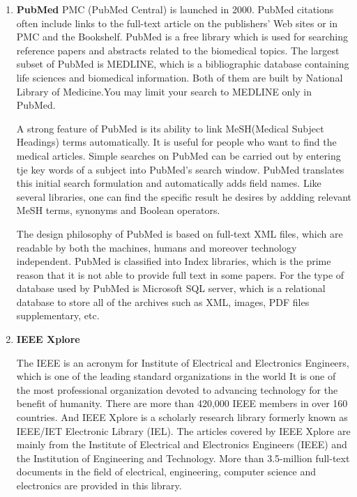 \begin{enumerate}
	
	\item\textbf{PubMed}
	\setlength{\parindent}{1em}
	 PMC (PubMed Central) is launched in 2000.
	 PubMed citations often include links to the full-text article on the publishers' Web sites or in PMC and the Bookshelf.
	 PubMed is a free library which is used for searching reference papers and abstracts related to the biomedical topics.
	 The largest subset of PubMed is MEDLINE, which is a bibliographic database containing life sciences and biomedical information.
	 Both of them are built by National Library of Medicine.You may limit your search to MEDLINE only in PubMed.
	 
	 A strong feature of PubMed is its ability to link MeSH(Medical Subject Headings) terms automatically. 
	 It is useful for people who want to find the medical articles. 
     Simple searches on PubMed can be carried out by entering tje key words of a subject into PubMed's search window.
     PubMed translates this initial search formulation and automatically adds field names.
	 Like several libraries, one can find the specific result he desires by addding relevant MeSH terms, synonyms and Boolean operators.
	 
	 The design philosophy of PubMed is based on full-text XML files, which are readable by both the machines, humans and moreover technology independent.
	 PubMed is classified into Index libraries, which is the prime reason that it is not able to provide full text in some papers.
	 For the type of database used by PubMed is Microsoft SQL server, which is a relational database to store all of 
	 the archives such as XML, images, PDF files supplementary, etc. 	 
	  
		
	\item\textbf{IEEE Xplore}
	\setlength{\parindent}{1em}
	
	The IEEE is an acronym for Institute of Electrical and Electronics Engineers, which is one of the leading standard organizations in the world 
	It is one of the most professional organization devoted to advancing technology for the benefit of humanity.
	There are more than 420,000 IEEE members in over 160 countries.
	And IEEE Xplore is a scholarly research library formerly known as IEEE/IET Electronic Library (IEL).
	The articles covered by IEEE Xplore are mainly from the Institute of Electrical and Electronics Engineers (IEEE) and the Institution of Engineering and Technology.
	More than 3.5-million full-text documents in the field of electrical, engineering, computer science and electronics are provided in this library. 
	

\end{enumerate}
